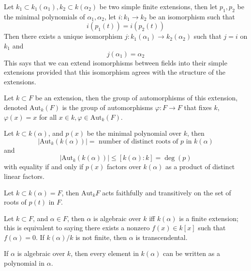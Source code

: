 \documentclass[openany]{book}
\newcommand{\aut}{\text{Aut}}
\begin{document}
\begin{prop}[lifting]
    Let $k_1\subset k_1(\alpha_1), k_2\subset k(\alpha_2)$ be two simple finite extensions, then let $p_1,p_2$ be the minimal polynomials of $\alpha_1,\alpha_2$, let $i: k_1\to k_2$ be an isomorphism such that 
    \begin{equation*}
        i(p_1(t))=i(p_2(t))
    \end{equation*}
    Then there exists a unique isomorphism $j: k_1(\alpha_1)\to k_2(\alpha_2)$ such that $j=i$ on $k_1$ and 
    \begin{equation*}
        j(\alpha_1)=\alpha_2
    \end{equation*}
    This says that we can extend isomorphisms between fields into their simple extensions provided that this isomorphism agrees with the structure of the extensions.
\end{prop}


\begin{defn}
    Let $k\subset F$ be an extension, then the group of automorphisms of this extension, denoted $\text{Aut}_k(F)$ is the group of automorphisms $\varphi:F\to F$ that fixes $k$, $\varphi(x)=x$ for all $x\in k, \varphi\in\text{Aut}_k(F)$.
\end{defn}

\begin{prop}
    Let $k\subset k(\alpha)$, and $p(x)$ be the minimal polynomial over $k$, then 
    \begin{equation*}
        |\text{Aut}_k(k(\alpha))|=\text{ number of distinct roots of $p$ in $k(\alpha)$}
    \end{equation*}
    and 
    \begin{equation*}
        |\text{Aut}_k(k(\alpha))|\leq [k(\alpha):k]=\deg(p)
    \end{equation*}
    with equality if and only if $p(x)$ factors over $k(\alpha)$ as a product of distinct linear factors.
\end{prop}

\begin{prop}
    Let $k\subset k(\alpha)=F$, then $\aut_kF$ acts faithfully and transitively on the set of roots of $p(t)$ in $F$. 
\end{prop}

\begin{defn}
    Let $k\subset F$, and $\alpha\in F$, then $\alpha$ is algebraic over $k$ iff $k(\alpha)$ is a finite extension; this is equivalent to saying there exists a nonzero $f(x)\in k[x]$ such that $f(\alpha)=0$. If $k(\alpha)/k$ is not finite, then $\alpha$ is transcendental.

    If $\alpha$ is algebraic over $k$, then every element in $k(\alpha)$ can be written as a polynomial in $\alpha$.
\end{defn}
\end{document}
